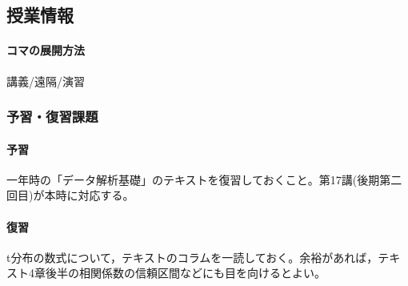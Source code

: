 \subsection{授業情報}
\paragraph{コマの展開方法}
講義/遠隔/演習
\subsubsection{予習・復習課題}
\paragraph{予習} 一年時の「データ解析基礎」のテキストを復習しておくこと。第17講(後期第二回目)が本時に対応する。
\paragraph{復習} t分布の数式について，テキストのコラムを一読しておく。余裕があれば，テキスト4章後半の相関係数の信頼区間などにも目を向けるとよい。